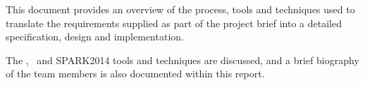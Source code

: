 \label{ProcessOverview}

This document provides an overview of the process, tools and
techniques used to translate the requirements supplied as
part of the project brief into a detailed specification, design
and implementation.

The \reveal, \informed\ and SPARK2014 tools and techniques are
discussed, and a brief biography of the team members is also
documented within this report.


